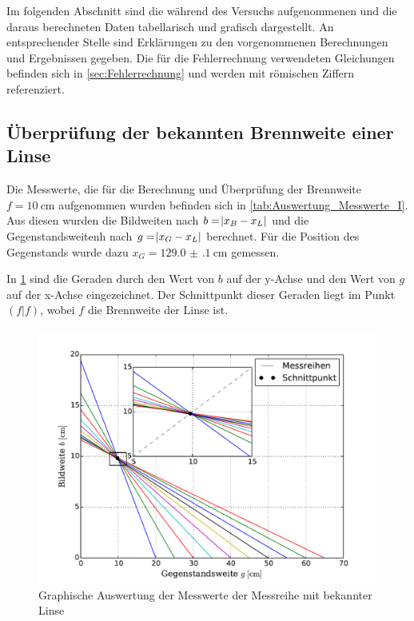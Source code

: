 Im folgenden Abschnitt sind die während des Versuchs aufgenommenen 
und die daraus berechneten Daten tabellarisch und grafisch dargestellt.
An entsprechender Stelle sind Erklärungen zu den vorgenommenen Berechnungen 
und Ergebnissen gegeben. Die für die Fehlerrechnung verwendeten Gleichungen
befinden sich in \cref{sec:Fehlerrechnung} und werden mit römischen Ziffern
referenziert.

\subsection{Überprüfung der bekannten Brennweite einer Linse}

	Die Messwerte, die für die Berechnung und Überprüfung der Brennweite $f=\SI{10}{\centi\meter}$ aufgenommen wurden 
	befinden sich in \cref{tab:Auswertung_Messwerte_I}.
	Aus diesen wurden die Bildweiten nach $b = \envert{x_{B} - x_{L}}$ und die Gegenstandsweitenh 
	nach  $g = \envert{x_{G} - x_{L}}$ berechnet. Für die Position des Gegenstands wurde dazu $x_{G} = \SI{129.0(1)}{\cm}$ gemessen.
	
	
	  			
	
	In \cref{fig:Auswertung_BekannteLinse} sind die Geraden durch den Wert von $b$ auf der y-Achse und den Wert von $g$
	auf der x-Achse eingezeichnet. Der Schnittpunkt dieser Geraden liegt im Punkt $(f|f)$, wobei $f$
	die Brennweite der Linse ist. 
	  
	\begin{figure}[!h]
		\centering
		\includegraphics[scale=.7]{Grafiken/Messwerte_Bekannt.pdf}
		\caption{Graphische Auswertung der Messwerte der Messreihe mit bekannter Linse \label{fig:Auswertung_BekannteLinse}}
	\end{figure}  
	 
